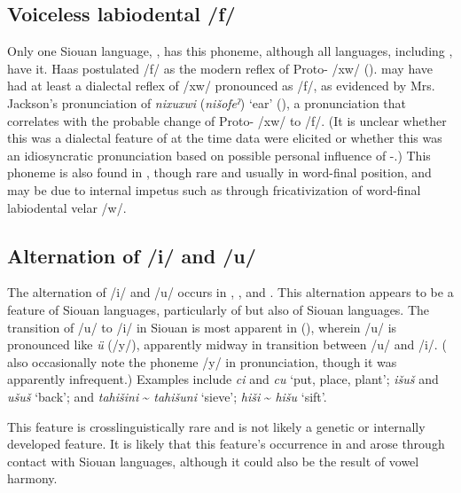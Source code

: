 \documentclass[output=paper]{LSP/langsci}
\begin{document}
\subsection{Voiceless labiodental  /f/}

Only one Siouan language, , has this phoneme, although all  languages, including , have it. Haas postulated  /f/ as the modern reflex of Proto- /xw/ (\citeyear[36]{Haas1969}).  may have had at least a dialectal reflex of /xw/ pronounced as /f/, as evidenced by Mrs. Jackson’s pronunciation of \emph{nixuxwi} (\emph{nišofeˀ}) `ear' (\citealt[79]{HaasSwadesh1968}), a pronunciation that correlates with the probable change of Proto- /xw/ to /f/. (It is unclear whether this was a dialectal feature of  at the time data were elicited or whether this was an idiosyncratic pronunciation based on possible personal influence of -.) This phoneme is also found in , though rare and usually in word-final position, and may be due to internal impetus such as through fricativization of word-final labiodental velar /w/.

\subsection{Alternation of /i/ and /u/}
	
The alternation of /i/ and /u/ occurs in , , and . This alternation appears to be a feature of Siouan languages, particularly of  but also of  Siouan languages. The transition of /u/ to /i/ in Siouan is most apparent in  (), wherein /u/ is pronounced like  \emph{ü} (/y/), apparently midway in transition between /u/ and /i/. (\citealt{DorseySwanton1912} also occasionally note the phoneme /y/ in  pronunciation, though it was apparently infrequent.) Examples include  \emph{ci} and \emph{cu} `put, place, plant';  \emph{išuš} and \emph{ušuš} `back'; and  \emph{tahišini} \textasciitilde{} \emph{tahišuni} `sieve';  \emph{hiši} \textasciitilde{} \emph{hišu} `sift'.

This feature is crosslinguistically rare and is not likely a genetic or internally developed feature. It is likely that this feature’s occurrence in  and  arose through contact with Siouan languages, although it could also be the result of vowel harmony. 
\end{document}
